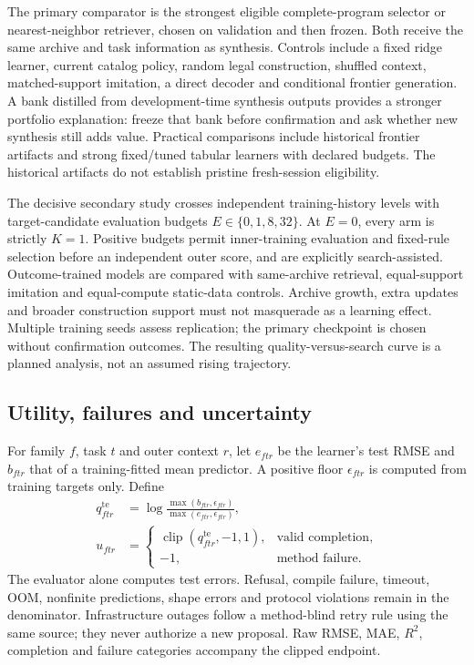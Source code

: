 The primary comparator is the strongest eligible complete-program selector or
nearest-neighbor retriever, chosen on validation and then frozen. Both receive
the same archive and task information as synthesis. Controls include a fixed
ridge learner, current catalog policy, random legal construction, shuffled
context, matched-support imitation, a direct decoder and conditional frontier
generation. A bank distilled from development-time synthesis outputs provides a
stronger portfolio explanation: freeze that bank before confirmation and ask
whether new synthesis still adds value. Practical comparisons include historical
frontier artifacts and strong fixed/tuned tabular learners with declared budgets.
The historical artifacts do not establish pristine fresh-session eligibility.

The decisive secondary study crosses independent training-history levels with
target-candidate evaluation budgets $E\in\{0,1,8,32\}$. At $E=0$, every arm is
strictly $K=1$. Positive budgets permit inner-training evaluation and fixed-rule
selection before an independent outer score, and are explicitly search-assisted.
Outcome-trained models are compared with same-archive retrieval, equal-support
imitation and equal-compute static-data controls. Archive growth, extra updates
and broader construction support must not masquerade as a learning effect.
Multiple training seeds assess replication; the primary checkpoint is chosen
without confirmation outcomes. The resulting quality-versus-search curve is a
planned analysis, not an assumed rising trajectory.

\subsection{Utility, failures and uncertainty}

For family $f$, task $t$ and outer context $r$, let $e_{ftr}$ be the learner's
test RMSE and $b_{ftr}$ that of a training-fitted mean predictor. A positive floor
$\epsilon_{ftr}$ is computed from training targets only. Define
\begin{align}
 q^{\mathrm{te}}_{ftr}&=\log
   \frac{\max(b_{ftr},\epsilon_{ftr})}{\max(e_{ftr},\epsilon_{ftr})},\\
 u_{ftr}&=
 \begin{cases}
 \operatorname{clip}(q^{\mathrm{te}}_{ftr},-1,1),&\text{valid completion},\\
 -1,&\text{method failure}.
 \end{cases}
\end{align}
The evaluator alone computes test errors. Refusal, compile failure, timeout, OOM,
nonfinite predictions, shape errors and protocol violations remain in the
denominator. Infrastructure outages follow a method-blind retry rule using the
same source; they never authorize a new proposal. Raw RMSE, MAE, $R^2$, completion
and failure categories accompany the clipped endpoint.

